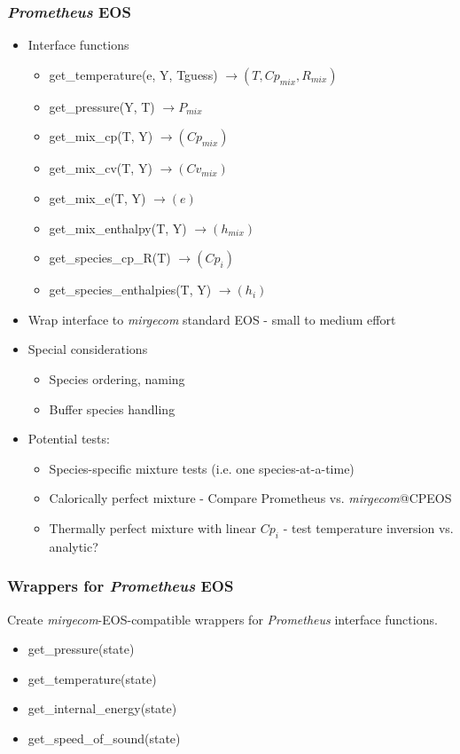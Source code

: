 \begin{frame}\frametitle{\textit{Prometheus} EOS}
\begin{multicols}{2}
\begin{itemize}
   \item Interface functions
   \begin{itemize}
      \item get\_temperature(e, Y, Tguess) $\rightarrow (T, Cp_{mix}, R_{mix})$
      \item get\_pressure(Y, T) $\rightarrow P_{mix}$ 
      \item get\_mix\_cp(T, Y) $\rightarrow (Cp_{mix})$ 
      \item get\_mix\_cv(T, Y) $\rightarrow (Cv_{mix})$
      \item get\_mix\_e(T, Y) $\rightarrow (e)$
      \item get\_mix\_enthalpy(T, Y) $\rightarrow (h_{mix})$
      \item get\_species\_cp\_R(T) $\rightarrow (Cp_{i})$ 
      \item get\_species\_enthalpies(T, Y) $\rightarrow (h_{i})$
   \end{itemize}
   \item Wrap interface to \textit{mirgecom} standard EOS - small to medium effort
   \item Special considerations
   \begin{itemize}
      \item Species ordering, naming
      \item Buffer species handling
   \end{itemize}
   \item Potential tests:
   \begin{itemize}
     \item Species-specific mixture tests (i.e. one species-at-a-time)
     \item Calorically perfect mixture - Compare Prometheus vs. \textit{mirgecom}@CPEOS
     \item Thermally perfect mixture with linear $Cp_i$ - test temperature inversion vs. analytic? 
   \end{itemize}
\end{itemize}
\end{multicols}
\end{frame}

\begin{frame}\frametitle{Wrappers for \textit{Prometheus} EOS}
Create \textit{mirgecom}-EOS-compatible wrappers for \textit{Prometheus} interface functions.
\begin{itemize}
\item get\_pressure(state)
\item get\_temperature(state)
\item get\_internal\_energy(state)
\item get\_speed\_of\_sound(state)
\end{itemize}
\end{frame}

